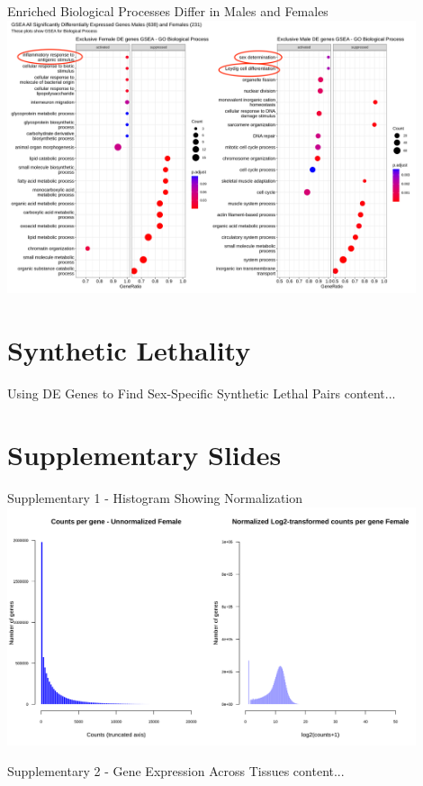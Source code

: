 \documentclass{beamer}
\begin{document}
	\begin{frame}{Enriched Biological Processes Differ in Males and Females}
		\includegraphics[width=12cm, height=8cm]{all_cancersgsea_exclusivedegenes_male_female_bp0.9.png}
	\end{frame}

	\section{Synthetic Lethality}
	\begin{frame}{Using DE Genes to Find Sex-Specific Synthetic Lethal Pairs}
		content...
	\end{frame}

	\section{Supplementary Slides}
	\begin{frame}{Supplementary 1 - Histogram Showing Normalization}
		\includegraphics[width=12cm, height=7cm]{all_cancers-F_before_and_after_normalization_hist.png}
	\end{frame}

	\begin{frame}{Supplementary 2 - Gene Expression Across Tissues}
		content...
	\end{frame}

	
\end{document}
